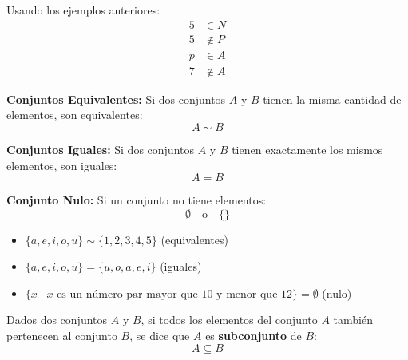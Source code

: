 \begin{example}
Usando los ejemplos anteriores:
\begin{align}
5 &\in N \\
5 &\notin P \\
p &\in A \\
7 &\notin A
\end{align}
\end{example}


\begin{definition}
\textbf{Conjuntos Equivalentes:} Si dos conjuntos $A$ y $B$ tienen la misma cantidad de elementos, son equivalentes:
$$A \sim B$$

\textbf{Conjuntos Iguales:} Si dos conjuntos $A$ y $B$ tienen exactamente los mismos elementos, son iguales:
$$A = B$$

\textbf{Conjunto Nulo:} Si un conjunto no tiene elementos:
$$\emptyset \quad \text{o} \quad \{ \}$$
\end{definition}

\begin{example}
\begin{itemize}
    \item $\{a, e, i, o, u\} \sim \{1, 2, 3, 4, 5\}$ (equivalentes)
    \item $\{a, e, i, o, u\} = \{u, o, a, e, i\}$ (iguales)
    \item $\{x \mid x \text{ es un número par mayor que 10 y menor que 12}\} = \emptyset$ (nulo)
\end{itemize}
\end{example}


\begin{definition}
Dados dos conjuntos $A$ y $B$, si todos los elementos del conjunto $A$ también pertenecen al conjunto $B$, se dice que $A$ es \textbf{subconjunto} de $B$:
$$A \subseteq B$$
\end{definition}

\begin{center}
\end{center}

